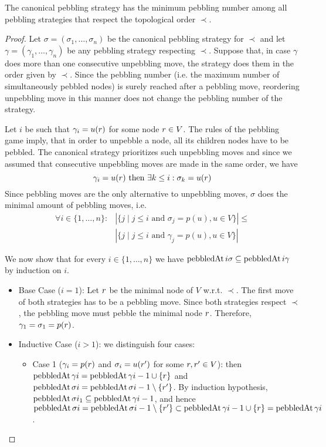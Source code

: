 \begin{theorem}
\label{theorem:canonical}
The canonical pebbling strategy has the minimum pebbling number among all pebbling strategies that respect the topological order $\prec$.
\end{theorem}
\begin{proof}
Let $\sigma = (\sigma_1,\ldots,\sigma_n)$ be the canonical pebbling strategy for $\prec$ and let $\gamma = (\gamma_1,\ldots,\gamma_n)$ be any pebbling strategy respecting $\prec$.
Suppose that, in case $\gamma$ does more than one consecutive unpebbling move, the strategy does them in the order given by $\prec$.
Since the pebbling number (i.e. the maximum number of simultaneously pebbled nodes) is surely reached after a pebbling move, reordering unpebbling move in this manner does not change the pebbling number of the strategy.

Let $i$ be such that $\gamma_i = u(r)$ for some node $r \in V$.
The rules of the pebbling game imply, that in order to unpebble a node, all its children nodes have to be pebbled.
The canonical strategy prioritizes such unpebbling moves and since we assumed that consecutive unpebbling moves are made in the same order, we have 
\begin{equation}
	\label{eq:proof1}
 \gamma_i = u(r) \text{ then }\exists k \leq i: \sigma_k = u(r)
\end{equation}
Since pebbling moves are the only alternative to unpebbling moves, $\sigma$ does the minimal amount of pebbling moves, 
i.e. 
\begin{equation}
	\label{eq:proof2}
	\begin{split}
	\forall i \in \{1,\ldots,n\}: &|\{j \mid j \leq i \text{ and }\sigma_j = p(u), u \in V\}| \leq \\
	&|\{j \mid j \leq i \text{ and }\gamma_j = p(u), u \in V\}|
	\end{split}
\end{equation}

We now show that for every $i \in \{1,\ldots,n\}$ we have $\operatorname{pebbledAt}{i}{\sigma} \subseteq \operatorname{pebbledAt}{i}{\gamma}$ by induction on $i$.
\begin{itemize}
\item Base Case ($i = 1$): Let $r$ be the minimal node of $V$ w.r.t. $\prec$.
The first move of both strategies has to be a pebbling move. Since both strategies respect $\prec$, the pebbling move must pebble the minimal node $r$. Therefore, $\gamma_1 = \sigma_1 = p(r)$.

\item Inductive Case ($i > 1$): we distinguish four cases:
\begin{itemize}
\item Case 1 ($\gamma_i = p(r)$ and $\sigma_i = u(r')$ for some $r, r' \in V$): then $\operatorname{pebbledAt}{\gamma}{i} = \operatorname{pebbledAt}{\gamma}{i-1} \cup \{r\}$ and $\operatorname{pebbledAt}{\sigma}{i} = \operatorname{pebbledAt}{\sigma}{i-1} \setminus \{r'\}$. By induction hypothesis,  $\operatorname{pebbledAt}{\sigma}{i_1} \subseteq \operatorname{pebbledAt}{\gamma}{i-1}$, and hence $\operatorname{pebbledAt}{\sigma}{i} = \operatorname{pebbledAt}{\sigma}{i-1} \setminus \{r'\} \subset \operatorname{pebbledAt}{\gamma}{i-1} \cup \{r\} = \operatorname{pebbledAt}{\gamma}{i}$.


\end{itemize}
\end{itemize}
\end{proof}
